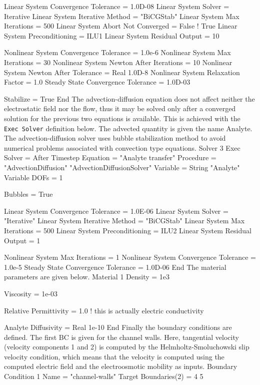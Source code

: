   Linear System Convergence Tolerance = 1.0D-08
  Linear System Solver = Iterative
  Linear System Iterative Method = "BiCGStab"
  Linear System Max Iterations = 500
  Linear System Abort Not Converged = False  ! True
  Linear System Preconditioning = ILU1 
  Linear System Residual Output = 10  

  Nonlinear System Convergence Tolerance = 1.0e-6
  Nonlinear System Max Iterations = 30
  Nonlinear System Newton After Iterations = 10
  Nonlinear System Newton After Tolerance =  Real 1.0D-8
  Nonlinear System Relaxation Factor = 1.0
  Steady State Convergence Tolerance =  1.0D-03

  Stabilize = True
End
\ttend
%
The advection-diffusion equation does not affect neither the
electrostatic field nor the flow, thus it may be solved only after a
converged solution for the previous two equations is available. This
is achieved with the \texttt{Exec Solver} definition below. The
advected quantity is given the name Analyte.
The advection-diffusion solver uses bubble stabilization method to
avoid numerical problems associated with convection type equations.
%
\ttbegin
Solver 3
  Exec Solver = After Timestep
  Equation = "Analyte transfer"
  Procedure = "AdvectionDiffusion" "AdvectionDiffusionSolver"
  Variable = String "Analyte"
  Variable DOFs = 1

  Bubbles = True

  Linear System Convergence Tolerance = 1.0E-06
  Linear System Solver = "Iterative"
  Linear System Iterative Method = "BiCGStab"
  Linear System Max Iterations = 500
  Linear System Preconditioning = ILU2
  Linear System Residual Output = 1

  Nonlinear System Max Iterations = 1
  Nonlinear System Convergence Tolerance = 1.0e-5
  Steady State Convergence Tolerance =  1.0D-06
End
\ttend
%
The material parameters are given below.
%
\ttbegin
Material 1
  Density = 1e3  
  
  Viscosity = 1e-03

  Relative Permittivity = 1.0    !  this is actually electric conductivity

  Analyte Diffusivity = Real 1e-10 
End
\ttend
%
Finally the boundary conditions are defined. The first BC is given for
the channel walls. Here, tangential velocity (velocity components 1
and 2) is computed by the Helmholtz-Smoluchowski slip velocity
condition, which means that the velocity is computed using the
computed electric field and the electroosmotic mobility as inputs. 
%
\ttbegin
Boundary Condition 1
  Name = "channel-walls"
  Target Boundaries(2) = 4 5

